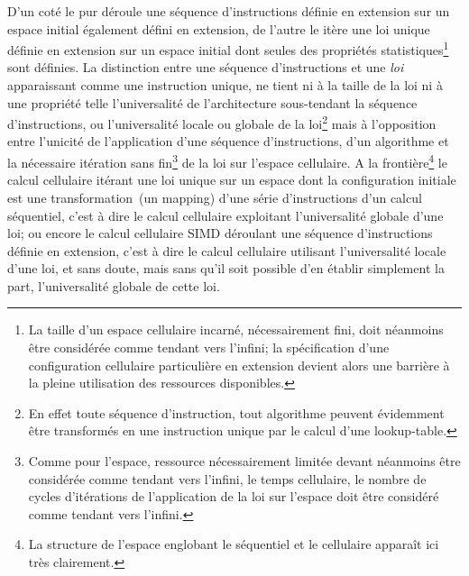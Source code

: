 D'un cot\'e le  pur d\'eroule une s\'equence
d'instructions d\'efinie en extension sur un espace initial \'egalement
d\'efini en extension, de l'autre le 
it\`ere une loi unique d\'efinie en extension sur un espace initial dont
seules des propri\'et\'es statistiques\footnote{%
  La taille d'un espace cellulaire incarn\'e, n\'ecessairement fini, doit
  n\'eanmoins \^etre consid\'er\'ee comme tendant vers l'infini; la
  sp\'ecification d'une configuration cellulaire particuli\`ere en
  extension devient alors une barri\`ere \`a la pleine utilisation des
  ressources disponibles.} %
sont d\'efinies. %
La distinction entre une s\'equence d'instructions et une \emph{loi}
apparaissant comme une instruction unique, ne tient ni \`a la taille de
la loi ni \`a une propri\'et\'e telle l'universalit\'e de l'architecture
sous-tendant la s\'equence d'instructions, ou l'universalit\'e
locale ou globale de la loi\footnote{%
  En effet toute s\'equence d'instruction, tout algorithme peuvent
  \'evidemment \^etre transform\'es en une instruction
  unique par le calcul d'une lookup-table.} %
mais \`a l'opposition entre l'unicit\'e de l'application d'une s\'equence
d'instructions, d'un algorithme et la n\'ecessaire it\'eration sans
fin\footnote{%
  Comme pour l'espace, ressource n\'ecessairement limit\'ee devant
  n\'eanmoins \^etre consid\'er\'ee comme tendant vers l'infini, le temps
  cellulaire, le nombre de cycles d'it\'erations de l'application de la
  loi sur l'espace doit \^etre consid\'er\'e comme tendant vers l'infini.} %
de la loi sur l'espace cellulaire. %
A la fronti\`ere\footnote{%
  La structure de l'espace englobant le s\'equentiel et le cellulaire
  appara\^it ici tr\`es clairement.} %
le calcul cellulaire it\'erant une loi unique sur un espace dont la
configuration ini\-tiale est une transformation~(un mapping) d'une s\'erie
d'instructions d'un calcul s\'equentiel, c'est \`a dire le calcul
cellulaire exploitant l'universalit\'e globale d'une loi; ou encore le
calcul cellulaire SIMD d\'eroulant une s\'equence d'instructions d\'efinie
en extension, c'est \`a dire le calcul cellulaire utilisant
l'universalit\'e locale d'une loi, et sans doute, mais sans qu'il soit
possible d'en \'etablir simplement la part, l'universalit\'e globale de
cette loi. %

